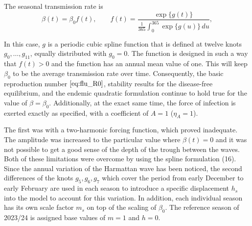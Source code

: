 \documentclass[12pt,a4paper]{article}
\theoremstyle{definition}
\theoremstyle{remark}
\begin{document}
The seasonal transmission rate is
\begin{equation}\label{eq:spline_forcing}
\beta(t) = \beta_0 f(t), \qquad f(t) = \frac{\exp\{g(t)\}}{\frac{1}{365}\int_0^{365}\exp\{g(u)\}\,du},
\end{equation}

In this case, $g$ is a periodic cubic spline function that is defined at twelve knots $g_0, \dots, g_{11}$, equally distributed with $g_0 = 0$. The function is designed in such a way that $f(t) > 0$ and the function has an annual mean value of one. This will keep $\beta_0$ to be the average transmission rate over time. Consequently, the basic reproduction number $\eqref{eq:flu_R0}$, stability results for the disease-free equilibrium, and the endemic quadratic formulation continue to hold true for the value of $\beta = \beta_0$. Additionally, at the exact same time, the force of infection is exerted exactly as specified, with a coefficient of $A=1$ ($\eta_A = 1$).




The first was with a two-harmonic forcing function, which proved inadequate. The amplitude was increased to the particular value where $\beta(t) = 0$ and it was not possible to get a good sense of the depth of the trough between the waves. Both of these limitations were overcome by using the spline formulation (16). Since the annual variation of the Harmattan wave has been noticed, the second differences of the knots $g_5, g_6, g_7$ which cover the period from early December to early February are used in each season to introduce a specific displacement $h_s$ into the model to account for this variation. In addition, each individual season has its own scale factor $m_s$ on top of the scaling of $\beta_0$. The reference season of 2023/24 is assigned base values of $m = 1$ and $h = 0$.
\end{document}
